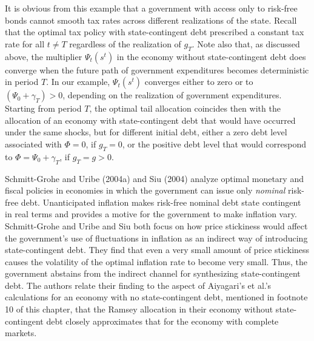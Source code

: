 It is obvious from this example that a government with access only
to risk-free bonds cannot smooth tax rates across  different
realizations of the state. Recall that the optimal tax policy with
state-contingent debt prescribed a constant tax rate for all
$t\not=T$ regardless of the realization of $g_T$. Note also that,
as discussed above, the multiplier $\Psi_t(s^t)$ in the economy
without state-contingent debt does converge when the future path
of government expenditures becomes deterministic in period $T$. In
our example, $\Psi_t(s^t)$ converges  either to zero or to
$(\Psi_0+\gamma_T)>0$, depending on the realization of government
expenditures. Starting from period $T$, the optimal tail
allocation coincides then with the allocation of an economy with
state-contingent debt that would have occurred under the same
shocks, but for different initial debt, either a zero debt level
associated with $\Phi=0$, if $g_T=0$, or the positive
debt level that would correspond to $\Phi = \Psi_0+\gamma_T$, if
$g_T=g>0$.

Schmitt-Grohe and Uribe (2004a) and Siu (2004) analyze optimal
monetary and fiscal policies in economies in which the government
can issue only {\it nominal\/} risk-free debt.  Unanticipated
inflation makes risk-free nominal debt state contingent in real
terms
 and  provides a motive for the government to make inflation
vary. Schmitt-Grohe and Uribe and Siu both focus on how
price stickiness would affect the
 government's use of fluctuations in
inflation as an indirect way of introducing state-contingent
debt.  They find that  even a very small amount of
price stickiness causes the volatility of
the optimal inflation rate to become very small. Thus, the
government abstains from the indirect channel for synthesizing
state-contingent debt. The authors relate their finding to the
aspect of Aiyagari's et al.'s calculations for an economy with no
state-contingent debt, mentioned in  footnote 10 of this chapter, that the Ramsey
allocation in their economy without state-contingent debt closely
approximates that for the economy with complete markets.



